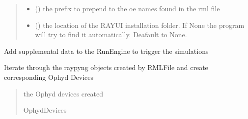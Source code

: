 \documentclass[letterpaper,10pt,english]{sphinxmanual}
\begin{document}
\begin{fulllineitems}
\begin{quote}
\begin{description}
\begin{itemize}
\item {} 
\sphinxAtStartPar
{} () \textendash{} the prefix to prepend to the oe names found in the rml file

\item {} 
\sphinxAtStartPar
{} () \textendash{} the location of the RAY\sphinxhyphen{}UI installation folder. If None the program will try to find it automatically. Deafault to None.

\end{itemize}

\end{description}\end{quote}

\begin{fulllineitems}
\label{\detokenize{API:raypyng_bluesky.RaypyngOphydDevices.RaypyngOphydDevices.append_preprocessor}}
\pysigstartsignatures
{}
\pysigstopsignatures
\sphinxAtStartPar
Add supplemental data to the RunEngine to trigger the simulations

\end{fulllineitems}


\begin{fulllineitems}
\label{\detokenize{API:raypyng_bluesky.RaypyngOphydDevices.RaypyngOphydDevices.create_raypyng_elements_from_rml}}
\pysigstartsignatures
{}
\pysigstopsignatures
\sphinxAtStartPar
Iterate through the raypyng objects created by RMLFile and create corresponding Ophyd Devices
\begin{quote}\begin{description}
\sphinxAtStartPar
the Ophyd devices created

\sphinxAtStartPar
OphydDevices


\end{description}
\end{quote}
\end{fulllineitems}
\end{fulllineitems}
\end{document}
